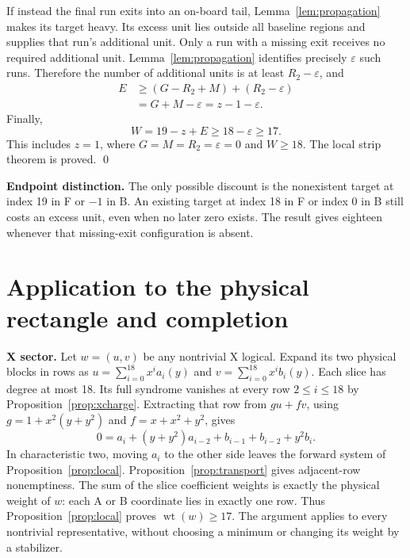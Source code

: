 \documentclass{article}
\DeclareMathOperator{\wt}{wt}
\begin{document}
If instead the final run exits into an on-board tail, Lemma~\ref{lem:propagation} makes its
target heavy. Its excess unit lies outside all baseline regions and supplies that run's
additional unit. Only a run with a missing exit receives no required additional unit.
Lemma~\ref{lem:propagation} identifies precisely \(\varepsilon\) such runs. Therefore the number
of additional units is at least \(R_2 - \varepsilon\), and
\begin{equation}
  \begin{aligned}
    E &\ge (G - R_2 + M) + (R_2 - \varepsilon) \\
      &= G + M - \varepsilon = z - 1 - \varepsilon.
  \end{aligned}
\end{equation}
Finally,
\begin{equation}
  W = 19 - z + E \ge 18 - \varepsilon \ge 17.
\end{equation}
This includes \(z = 1\), where \(G = M = R_2 = \varepsilon = 0\) and \(W \ge 18\). The local
strip theorem is proved. \qed

\textbf{Endpoint distinction.} The only possible discount is the nonexistent target at index 19
in F or \(-1\) in B. An existing target at index 18 in F or index 0 in B still costs an excess
unit, even when no later zero exists. The result gives eighteen whenever that missing-exit
configuration is absent.

\section{Application to the physical rectangle and completion}\label{sec:application}

\textbf{X sector.} Let \(w = (u,v)\) be any nontrivial X logical. Expand its two physical blocks
in rows as \(u = \sum_{i=0}^{18} x^i a_i(y)\) and \(v = \sum_{i=0}^{18} x^i b_i(y)\). Each slice
has degree at most 18. Its full syndrome vanishes at every row \(2 \le i \le 18\) by
Proposition~\ref{prop:xcharge}. Extracting that row from \(gu + fv\), using
\(g = 1 + x^2(y + y^2)\) and \(f = x + x^2 + y^2\), gives
\begin{equation}
  0 = a_i + (y + y^2) a_{i-2} + b_{i-1} + b_{i-2} + y^2 b_i.
\end{equation}
In characteristic two, moving \(a_i\) to the other side leaves the forward system of
Proposition~\ref{prop:local}. Proposition~\ref{prop:transport} gives adjacent-row nonemptiness.
The sum of the slice coefficient weights is exactly the physical weight of \(w\): each A or B
coordinate lies in exactly one row. Thus Proposition~\ref{prop:local} proves \(\wt(w) \ge 17\).
The argument applies to every nontrivial representative, without choosing a minimum or changing
its weight by a stabilizer.
\end{document}
